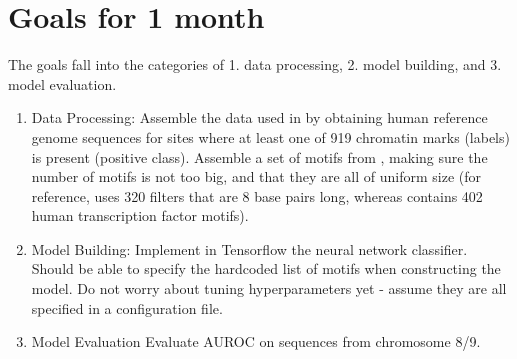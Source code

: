 \documentclass[11pt]{amsart}
\begin{document}
\section{Goals for 1 month}
The goals fall into the categories of 1. data processing, 2. model building, and 3. model evaluation.
\begin{enumerate}
\item Data Processing: Assemble the data used in \cite{zhou2015predicting} by obtaining human reference genome sequences for sites where at least one of 919 chromatin marks (labels) is present (positive class).  Assemble a set of motifs from \cite{doi:10.1093/nar/gkx1106}, making sure the number of motifs is not too big, and that they are all of uniform size (for reference, \cite{zhou2015predicting} uses 320 filters that are 8 base pairs long, whereas \cite{doi:10.1093/nar/gkx1106} contains 402 human transcription factor motifs).
\item Model Building: Implement in Tensorflow the neural network classifier.  Should be able to specify the hardcoded list of motifs when constructing the model.  Do not worry about tuning hyperparameters yet - assume they are all specified in a configuration file.
\item Model Evaluation Evaluate AUROC on sequences from chromosome 8/9.
\end{enumerate}



\end{document}

